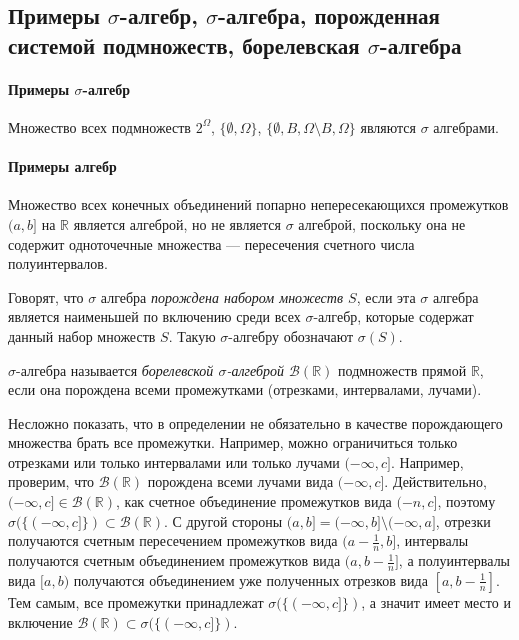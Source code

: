 \sectionbreak
\subsection{Примеры $\sigma$-алгебр, $\sigma$-алгебра, порожденная системой подмножеств, борелевская $\sigma$-алгебра}

\paragraph{Примеры $\sigma$-алгебр}
Множество всех подмножеств $2^{\Omega}$, $\{\emptyset, \Omega\}$, $\{\emptyset, B, \Omega\setminus B, \Omega\}$ являются $\sigma$ алгебрами.

\paragraph{Примеры алгебр}
Множество всех конечных объединений попарно непересекающихся промежутков $(a, b]$ на $\mathbb{R}$ является алгеброй, но не является $\sigma$ алгеброй, поскольку она не содержит одноточечные множества --- пересечения счетного числа полуинтервалов.

\begin{definition*}
    Говорят, что $\sigma$ алгебра {\it порождена набором множеств $S$}, если эта $\sigma$ алгебра является наименьшей по включению среди всех $\sigma$-алгебр, которые содержат данный набор множеств $S$.
    Такую $\sigma$-алгебру обозначают $\sigma(S)$.
\end{definition*}

\begin{definition*}
    $\sigma$-алгебра называется {\it борелевской $\sigma$-алгеброй $\mathcal{B}(\mathbb{R})$} подмножеств прямой $\mathbb{R}$, если она порождена всеми промежутками (отрезками, интервалами, лучами).
\end{definition*}

Несложно показать, что в определении не обязательно в качестве порождающего множества брать все промежутки.
Например, можно ограничиться только отрезками или только интервалами или только лучами $(-\infty, c]$.
Например, проверим, что $\mathcal{B}(\mathbb{R})$ порождена всеми лучами вида $(-\infty, c]$.
Действительно, $(-\infty, c] \in \mathcal{B}(\mathbb{R})$, как счетное объединение промежутков вида $(-n, c]$, поэтому $\sigma(\{(-\infty, c]\}) \subset \mathcal{B}(\mathbb{R})$.
С другой стороны $(a, b] = (-\infty, b] \setminus (-\infty, a]$, отрезки получаются счетным пересечением промежутков вида $(a-\frac{1}{n}, b]$, интервалы получаются счетным объединением промежутков вида $(a, b-\frac{1}{n}]$, а полуинтервалы вида $[a, b)$ получаются объединением уже полученных отрезков вида $[a, b-\frac{1}{n}]$.
Тем самым, все промежутки принадлежат $\sigma(\{(-\infty, c]\})$, а значит имеет место и включение $\mathcal{B}(\mathbb{R})\subset \sigma(\{(-\infty, c]\})$.